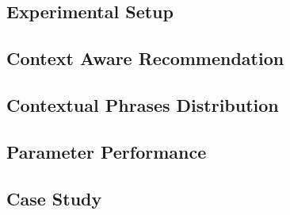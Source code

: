 \documentclass{llncs}
\begin{document}
\subsection{Experimental Setup}

\subsection{Context Aware Recommendation}

\subsection{Contextual Phrases Distribution}

\subsection{Parameter Performance}

\subsection{Case Study}
\end{document}
